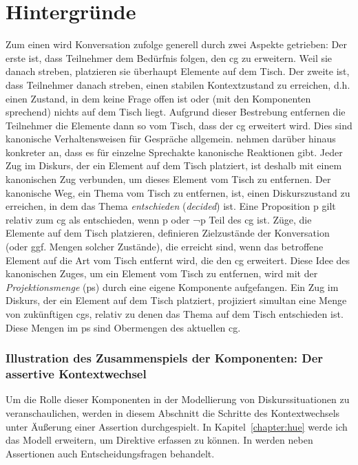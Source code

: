 \setcounter{chapter}{1}
\chapter{Hintergründe}
\setcounter{section}{3}
\setcounter{subsection}{1}
Zum einen wird Konversation \citet{Farkas2010} zufolge generell durch zwei Aspekte getrieben: Der erste ist, dass Teilnehmer dem Bedürfnis folgen, den cg zu erweitern. Weil sie danach streben, platzieren sie überhaupt Elemente auf dem Tisch. Der zweite ist, dass Teilnehmer danach streben, einen stabilen Kontextzustand zu erreichen, d.h. einen Zustand, in dem keine Frage offen ist oder (mit den Komponenten sprechend) nichts auf dem Tisch liegt. Aufgrund dieser Bestrebung entfernen die Teilnehmer die Elemente dann so vom Tisch, dass der cg erweitert wird. Dies sind kanonische Verhaltensweisen für Gespräche allgemein. \citet{Farkas2010} nehmen darüber hinaus konkreter an, dass es für einzelne Sprechakte kanonische Reaktionen gibt. Jeder Zug im Diskurs, der ein Element auf dem Tisch platziert, ist deshalb mit einem kanonischen Zug verbunden, um dieses  Element vom Tisch zu entfernen. Der kanonische Weg, ein Thema vom Tisch zu entfernen, ist, einen Diskurszustand zu erreichen, in dem das Thema \textit{entschieden} (\textit{decided})  ist. Eine Proposition p gilt relativ zum cg als entschieden, wenn p oder ¬p Teil des cg ist.  Züge, die Elemente auf dem Tisch platzieren, definieren Zielzustände der Konversation (oder ggf. Mengen solcher Zustände), die erreicht sind, wenn das betroffene Element auf die Art vom Tisch entfernt wird, die den cg erweitert. Diese Idee des kanonischen Zuges, um ein Element vom Tisch zu entfernen, wird mit der \textit{Projektionsmenge} (ps)  durch eine eigene Komponente aufgefangen. Ein Zug im Diskurs, der ein Element auf dem Tisch platziert, projiziert simultan eine Menge von zukünftigen cgs, relativ zu denen das Thema auf dem Tisch entschieden ist. Diese Mengen im ps sind Obermengen des aktuellen cg. 

\subsection{Illustration des Zusammenspiels der Komponenten: Der assertive Kontextwechsel}
Um die Rolle dieser Komponenten in der Modellierung von Diskurssituationen zu veranschaulichen, werden in diesem Abschnitt die Schritte des Kontextwechsels unter Äußerung einer Assertion  durchgespielt. In Kapitel~\ref{chapter:hue} werde ich das Mo\-dell erweitern, um Direktive erfassen zu können. In \citet{Farkas2010} werden neben Assertionen auch Entscheidungsfragen behandelt.


